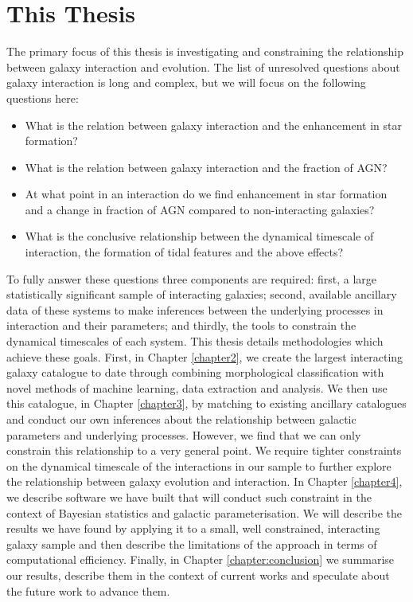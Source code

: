 \section{This Thesis}
\noindent The primary focus of this thesis is investigating and constraining the relationship between galaxy interaction and evolution. The list of unresolved questions about galaxy interaction is long and complex, but we will focus on the following questions here:

\begin{itemize}
\item What is the relation between galaxy interaction and the enhancement in star formation?
\item What is the relation between galaxy interaction and the fraction of AGN?
\item At what point in an interaction do we find enhancement in star formation and a change in fraction of AGN compared to non-interacting galaxies?
\item What is the conclusive relationship between the dynamical timescale of interaction, the formation of tidal features and the above effects?
\end{itemize}

To fully answer these questions three components are required: first, a large statistically significant sample of interacting galaxies; second, available ancillary data of these systems to make inferences between the underlying processes in interaction and their parameters; and thirdly, the tools to constrain the dynamical timescales of each system. This thesis details methodologies which achieve these goals. First, in Chapter \ref{chapter2}, we create the largest interacting galaxy catalogue to date through combining morphological classification with novel methods of machine learning, data extraction and analysis. We then use this catalogue, in Chapter \ref{chapter3}, by matching to existing ancillary catalogues and conduct our own inferences about the relationship between galactic parameters and underlying processes. However, we find that we can only constrain this relationship to a very general point. We require tighter constraints on the dynamical timescale of the interactions in our sample to further explore the relationship between galaxy evolution and interaction. In Chapter \ref{chapter4}, we describe software we have built that will conduct such constraint in the context of Bayesian statistics and galactic parameterisation. We will describe the results we have found by applying it to a small, well constrained, interacting galaxy sample and then describe the limitations of the approach in terms of computational efficiency. Finally, in Chapter \ref{chapter:conclusion} we summarise our results, describe them in the context of current works and speculate about the future work to advance them.

